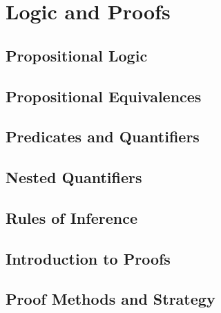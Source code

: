 \documentclass[../discrete.tex]{subfiles}
\begin{document}
\chapter{Logic and Proofs}
\section{Propositional Logic}
\section{Propositional Equivalences}
\section{Predicates and Quantifiers}
\section{Nested Quantifiers}
\section{Rules of Inference}
\section{Introduction to Proofs}
\section{Proof Methods and Strategy}
\end{document}
